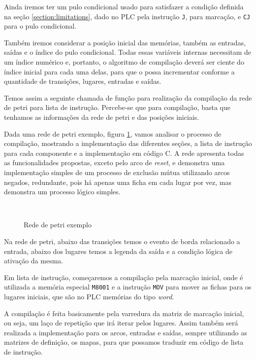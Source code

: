 Ainda iremos ter um pulo condicional usado para satisfazer a condição definida na seção \ref{section:limitations}, dado no PLC pela instrução \lstinline{J}, para marcação, e \lstinline{CJ} para o pulo condicional.

Também iremos considerar a posição inicial das memórias, também as entradas, saídas e o índice do pulo condicional. Todas essas variáveis internas necessitam de um índice numérico e, portanto, o algoritmo de compilação deverá ser ciente do índice inicial para cada uma delas, para que o possa incrementar conforme a quantidade de transições, lugares, entradas e saídas. 

Temos assim a seguinte chamada de função para realização da compilação da rede de petri para lista de instrução. Percebe-se que para compilação, basta que tenhamos as informações da rede de petri e das posições iniciais.



Dada uma rede de petri exemplo, figura \ref{fig:pnetcomp}, vamos analisar o processo de compilação, mostrando a implementação das diferentes seções, a lista de instrução para cada componente e a implementação em código C. A rede apresenta todas as funcionalidades propostas, exceto pelo arco de \textit{reset}, e demonstra uma implementação simples de um processo de exclusão mútua utilizando arcos negados, redundante, pois há apenas uma ficha em cada lugar por vez, mas demonstra um processo lógico simples. 

\begin{figure}[ht]
	\centering
	\caption{Rede de petri exemplo}
	\\
	\label{fig:pnetcomp}
\end{figure}

Na rede de petri, abaixo das transições temos o evento de borda relacionado a entrada, abaixo dos lugares temos a legenda da saída e a condição lógica de ativação da mesma.

Em lista de instrução, começaremos a compilação pela marcação inicial, onde é utilizada a memória especial \lstinline{M8001} e a instrução \lstinline{MOV} para mover as fichas para os lugares iniciais, que são no PLC memórias do tipo \textit{word}.

A compilação é feita basicamente pela varredura da matriz de marcação inicial, ou seja, um laço de repetição que irá iterar pelos lugares. Assim também será realizada a implementação para os arcos, entradas e saídas, sempre utilizando as matrizes de definição, os mapas, para que possamos traduzir em código de lista de instrução.

